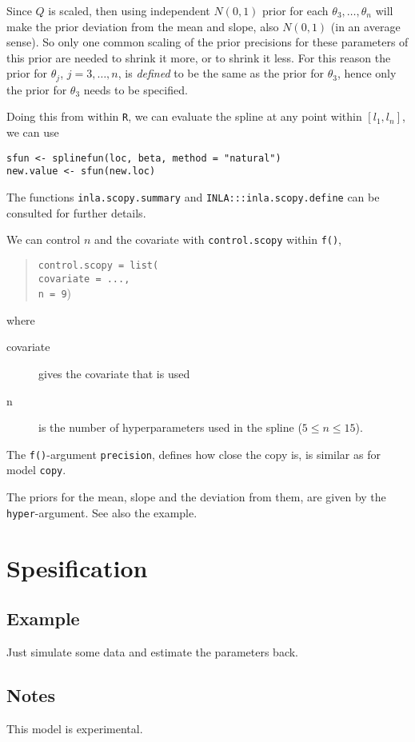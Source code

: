 \documentclass[a4paper,11pt]{article}
\begin{document}
Since $Q$ is scaled, then using independent $N(0,1)$ prior for each
$\theta_{3}, \ldots, \theta_n$ will make the prior deviation from the
mean and slope, also $N(0,1)$ (in an average sense). So only one
common scaling of the prior precisions for these parameters of this
prior are needed to shrink it more, or to shrink it less. For this
reason the prior for $\theta_{j}$, $j=3, \ldots, n$, is \emph{defined}
to be the same as the prior for $\theta_3$, hence only the prior for
$\theta_3$ needs to be specified.

Doing this from within \texttt{R}, we can evaluate the spline at any
point within $[l_1, l_n]$, we can use
\begin{verbatim}
sfun <- splinefun(loc, beta, method = "natural")
new.value <- sfun(new.loc)
\end{verbatim}
The functions \texttt{inla.scopy.summary} and
\texttt{INLA:::inla.scopy.define} can be consulted for further
details.


We can control $n$ and the covariate with
\texttt{control.scopy} within \texttt{f()},
\begin{quote}
    \texttt{control.scopy = list(\\
        covariate = ..., \\
        n = 9})
\end{quote}
where
\begin{description}
\item[covariate] gives the covariate that is used
\item[n] is the number of hyperparameters used in the spline
    ($5 \leq n \leq 15$).
\end{description}
The \texttt{f()}-argument \texttt{precision}, defines how close the
copy is, is similar as for model \texttt{copy}.

The priors for the mean, slope and the deviation from them, are given
by the \texttt{hyper}-argument. See also the example.

\clearpage
\section*{Spesification}


\clearpage
\subsection*{Example}
Just simulate some data and estimate the parameters back. 
{\small}

\subsection*{Notes}

This model is experimental.
\end{document}
